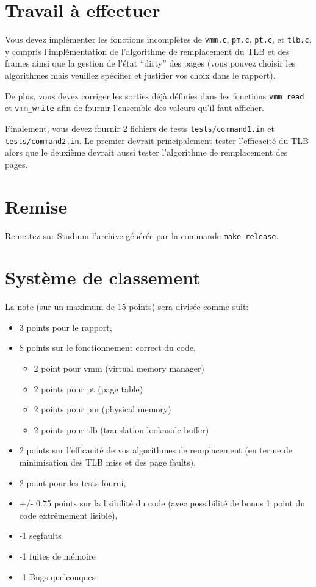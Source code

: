 \documentclass{article}
\begin{document}
\section{Travail à effectuer}

Vous devez implémenter les fonctions incomplètes de \texttt{vmm.c},
\texttt{pm.c}, \texttt{pt.c}, et \texttt{tlb.c}, y compris l'implémentation
de l'algorithme de remplacement du TLB et des frames ainsi que la gestion de
l'état ``dirty'' des pages (vous pouvez choisir les algorithmes mais veuillez spécifier et justifier vos choix dans le rapport).

De plus, vous devez corriger les sorties déjà définies dans les fonctions
\texttt{vmm\_read} et \texttt{vmm\_write} afin de fournir l'ensemble des
valeurs qu'il faut afficher.  

Finalement, vous devez fournir 2 fichiers de tests
\texttt{tests/command1.in} et \texttt{tests/command2.in}.  Le premier
devrait principalement tester l'efficacité du TLB alors que le deuxième
devrait aussi tester l'algorithme de remplacement des pages.

\section{Remise}

Remettez sur Studium l'archive générée par la commande \texttt{make release}.


\section{Système de classement}
La note (sur un maximum de 15 points) sera divisée comme suit:
\begin{itemize}
\item 3 points pour le rapport,
\item  8 points sur le fonctionnement correct du code,
  \begin{itemize}
  \item 2 point pour vmm (virtual memory manager)
  \item 2 points pour pt (page table)
  \item 2 points pour pm (physical memory)
  \item 2 points pour tlb (translation lookaside buffer)
  \end{itemize}
\item  2 points sur l'efficacité de vos algorithmes de remplacement (en terme de
  minimisation des TLB miss et des page faults).
\item 2 point pour les tests fourni,
\item +/- 0.75 points sur la lisibilité du code (avec possibilité de bonus 1 point du code extrêmement lisible),
\item -1 segfaults
\item -1 fuites de mémoire
\item -1 Bugs quelconques
\end{itemize}
\end{document}
